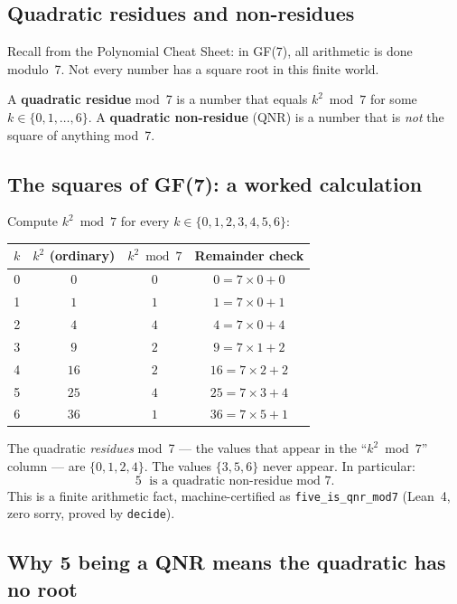 \documentclass[11pt,a4paper]{article}
\newcommand{\term}[1]{\textbf{#1}}
\newcommand{\lean}[1]{\texttt{#1}}
\begin{document}
\subsection{Quadratic residues and non-residues}

Recall from the Polynomial Cheat Sheet: in GF(7), all arithmetic is done
modulo~7.  Not every number has a square root in this finite world.

A \term{quadratic residue} mod~7 is a number that equals $k^2 \bmod 7$ for
some $k \in \{0, 1, \ldots, 6\}$.  A \term{quadratic non-residue} (QNR) is
a number that is \emph{not} the square of anything mod~7.

\subsection{The squares of GF(7): a worked calculation}

Compute $k^2 \bmod 7$ for every $k \in \{0, 1, 2, 3, 4, 5, 6\}$:

\bigskip
\begin{center}
\begin{tabular}{cccc}
\toprule
$k$ & $k^2$ (ordinary) & $k^2 \bmod 7$ & Remainder check \\
\midrule
0 & $0$  & $0$ & $0 = 7 \times 0 + 0$ \\
1 & $1$  & $1$ & $1 = 7 \times 0 + 1$ \\
2 & $4$  & $4$ & $4 = 7 \times 0 + 4$ \\
3 & $9$  & $2$ & $9 = 7 \times 1 + 2$ \\
4 & $16$ & $2$ & $16 = 7 \times 2 + 2$ \\
5 & $25$ & $4$ & $25 = 7 \times 3 + 4$ \\
6 & $36$ & $1$ & $36 = 7 \times 5 + 1$ \\
\bottomrule
\end{tabular}
\end{center}
\bigskip

The quadratic \emph{residues} mod~7 — the values that appear in the
``$k^2 \bmod 7$'' column — are $\{0, 1, 2, 4\}$.
The values $\{3, 5, 6\}$ never appear.  In particular:
\[
  5 \;\text{ is a quadratic non-residue mod } 7.
\]
This is a finite arithmetic fact, machine-certified as \lean{five\_is\_qnr\_mod7}
(Lean~4, zero sorry, proved by \texttt{decide}).

\subsection{Why 5 being a QNR means the quadratic has no root}
\end{document}
